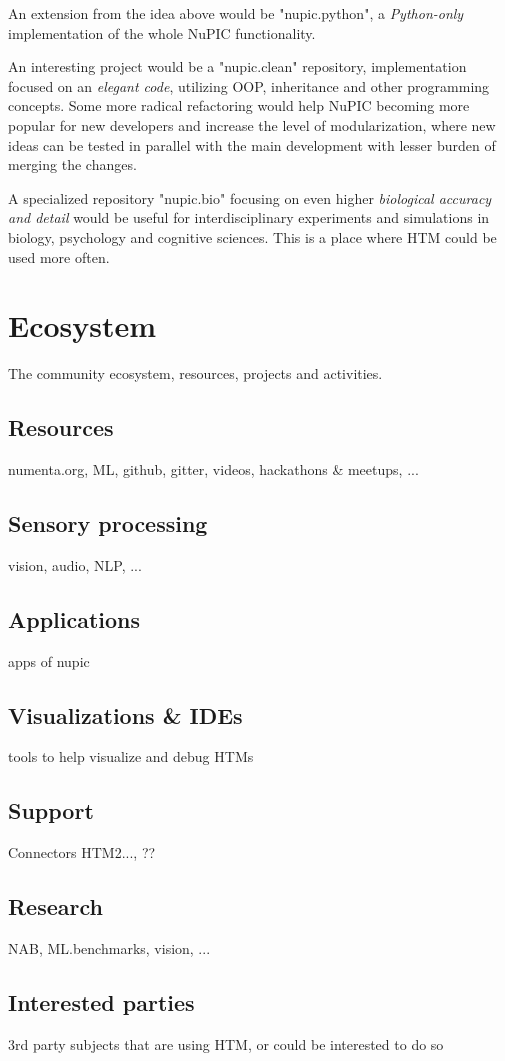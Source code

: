 \documentclass[a4,IEEEconf]{article}
\begin{document}
An extension from the idea above would be "nupic.python", a \textit{Python-only} implementation of the whole NuPIC functionality. 

An interesting project would be a "nupic.clean" repository, implementation focused on an \textit{elegant code}, utilizing OOP, inheritance and other programming concepts. Some more radical refactoring would help NuPIC becoming more popular for new developers and increase the level of modularization, where new ideas can be tested in parallel with the main development with lesser burden of merging the changes. 

A specialized repository "nupic.bio" focusing on even higher \textit{biological accuracy and detail} would be useful for interdisciplinary experiments and simulations in biology, psychology and cognitive sciences. This is a place where HTM could be used more often. 

\section{Ecosystem}
The community ecosystem, resources, projects and activities. 
\subsection{Resources}
numenta.org, ML, github, gitter, videos, hackathons \& meetups, ...
\subsection{Sensory processing}
vision, audio, NLP, ...
\subsection{Applications}
apps of nupic
\subsection{Visualizations \& IDEs}
tools to help visualize and debug HTMs
\subsection{Support}
Connectors HTM2..., ??
\subsection{Research}
NAB, ML.benchmarks, vision, ...
\subsection{Interested parties}
3rd party subjects that are using HTM, or could be interested to do so
\end{document}
